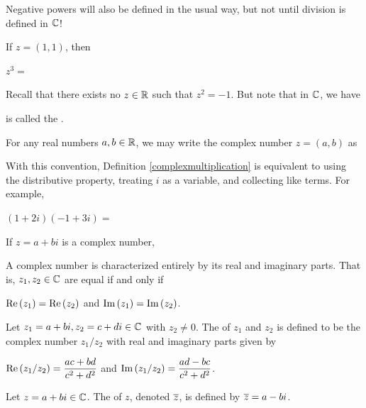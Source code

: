 \documentclass[11pt,fleqn,dvipsnames,usenames]{article}
\newcommand{\blank}[1]{\underline{\hspace{#1}}}
\newcommand{\p}{\noindent}
\begin{document}
\note Negative powers will also be defined in the usual way, but not until division is defined in $\mathbb{C}$!

\begin{example}
If $z = (1,1)$, then
\vsp

$z^3 =$
\vsp

\end{example}
%
\observation Recall that there exists no $z\in\mathbb{R}$ such that $z^2 = -1$.  But note that in $\mathbb{C}$, we have
\vspace{2cm}

\terminology \blank{3cm} is called the .
\vsp

\notation For any real numbers $a,b\in\mathbb{R}$, we may write the complex number $z = (a,b)$ as
\vspace{2cm}

\p With this convention, Definition \ref{complexmultiplication} is equivalent to using the distributive property, treating $i$ as a variable, and collecting like terms.  For example,
\vsp

$(1 + 2i)(-1 + 3i) =$
\vsp

\begin{definition}
If $z = a + bi$ is a complex number,
\vfill

\end{definition}

\note A complex number is characterized entirely by its real and imaginary parts.  That is, $z_{1},z_{2}\in\mathbb{C}$ are equal if and only if
\begin{center}
$\text{Re}\left(z_{1}\right) = \text{Re}\left(z_{2}\right)$ and $\text{Im}\left(z_{1}\right) = \text{Im}\left(z_{2}\right)$.
\end{center}
\newpage

%
\begin{definition}
Let $z_{1} = a+bi,z_{2} = c+di\in\mathbb{C}$ with $z_{2}\neq 0$.  The  of $z_{1}$ and $z_{2}$ is defined to be the complex number $z_{1}/z_{2}$ with real and imaginary parts given by
\begin{center}
$\text{Re}\left(z_{1}/z_{2}\right) = \dfrac{ac + bd}{c^2 + d^2}$ and $\text{Im}\left(z_{1}/z_{2}\right) = \dfrac{ad - bc}{c^2 + d^2}$.
\end{center}
\end{definition}
\vsmsp

\GRAYLINE
%

\begin{definition}
Let $z = a + bi\in\mathbb{C}$.  The  of $z$, denoted $\overline{z}$, is defined by $\overline{z} = a - bi$.
\end{definition}
\vsp
\end{document}
